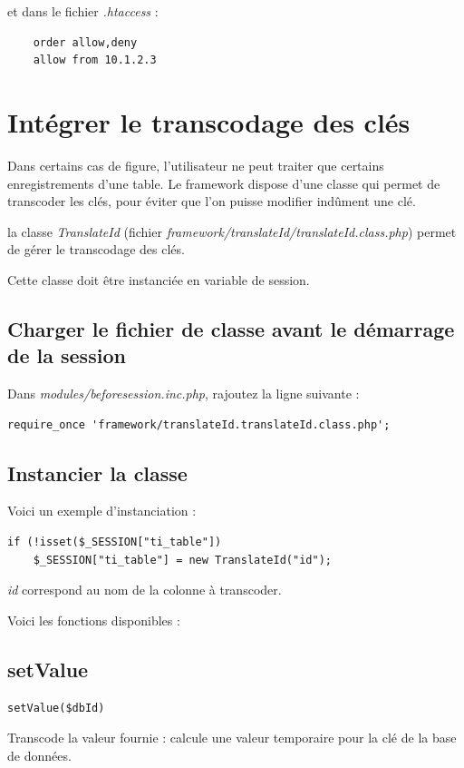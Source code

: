 et dans le fichier \textit{.htaccess} :
\begin{lstlisting}
    order allow,deny
    allow from 10.1.2.3
\end{lstlisting}

\section{Intégrer le transcodage des clés}

Dans certains cas de figure, l'utilisateur ne peut traiter que certains enregistrements d'une table. Le framework dispose d'une classe qui permet de transcoder les clés, pour éviter que l'on puisse modifier indûment une clé.

la classe \textit{TranslateId} (fichier \textit{framework/translateId/translateId.class.php}) permet de gérer le transcodage des clés.

Cette classe doit être instanciée en variable de session.

\subsection{Charger le fichier de classe avant le démarrage de la session}

Dans \textit{modules/beforesession.inc.php}, rajoutez la ligne suivante :
\begin{lstlisting}
require_once 'framework/translateId.translateId.class.php';
\end{lstlisting}

\subsection{Instancier la classe}
Voici un exemple d'instanciation :
\begin{lstlisting}
if (!isset($_SESSION["ti_table"]) 
	$_SESSION["ti_table"] = new TranslateId("id");
\end{lstlisting}

\textit{id} correspond au nom de la colonne à transcoder.

Voici les fonctions disponibles :

\subsection{setValue}
\begin{lstlisting}
setValue($dbId)
\end{lstlisting}
Transcode la valeur fournie : calcule une valeur temporaire pour la clé de la base de données.

